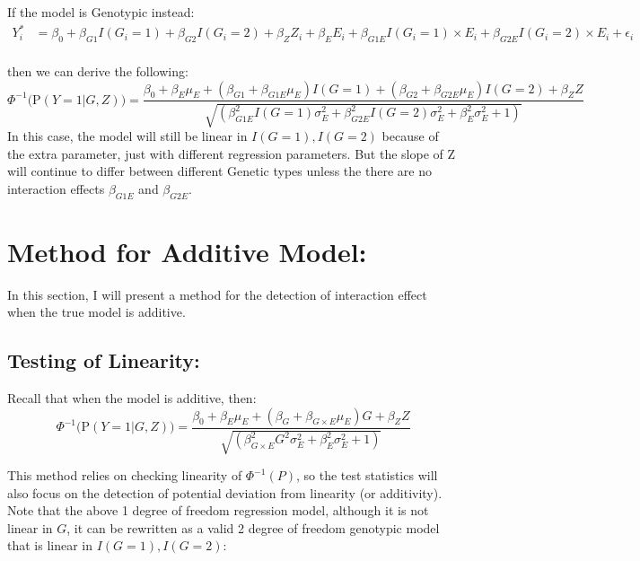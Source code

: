 \documentclass[
]{article}
\begin{document}
If the model is Genotypic instead: \begin{equation}\label{eqn:genointer}
\begin{aligned}
Y_i^* &= \beta_0 + \beta_{G1} I(G_i = 1) + \beta_{G2} I(G_i = 2) + \beta_Z Z_i + \beta_E E_i + \beta_{G1E} I(G_i = 1) \times E_i + \beta_{G2E} I(G_i = 2) \times E_i  + \epsilon_i \\
\end{aligned}
\end{equation}

then we can derive the following:
\[\Phi^{-1} \bigg(\text{P}(Y = 1 | G, Z) \bigg) = \frac{\beta_0+\beta_E \mu_E+(\beta_{G1} + \beta_{G1E} \mu_E)I(G = 1)+(\beta_{G2} + \beta_{G2E} \mu_E)I(G = 2) + \beta_Z Z}{\sqrt{(\beta_{G1E}^2 I(G = 1) \sigma_E^2 +\beta_{G2E}^2 I(G = 2) \sigma_E^2 + \beta_E^2 \sigma_E^2 + 1)}} \]
In this case, the model will still be linear in \(I(G = 1), I(G = 2)\)
because of the extra parameter, just with different regression
parameters. But the slope of Z will continue to differ between different
Genetic types unless the there are no interaction effects
\(\beta_{G1E}\) and \(\beta_{G2E}\).

\clearpage

\hypertarget{method-for-additive-model}{%
\section{Method for Additive Model:}\label{method-for-additive-model}}

In this section, I will present a method for the detection of
interaction effect when the true model is additive.

\hypertarget{testing-of-linearity}{%
\subsection{Testing of Linearity:}\label{testing-of-linearity}}

Recall that when the model is additive, then:
\[\Phi^{-1} \bigg(\text{P}(Y = 1 | G, Z) \bigg) = \frac{\beta_0+\beta_E \mu_E+(\beta_G + \beta_{G\times E} \mu_E)G + \beta_Z Z}{\sqrt{(\beta_{G\times E}^2 G^2 \sigma_E^2 + \beta_E^2 \sigma_E^2 + 1)}}\]

This method relies on checking linearity of \(\Phi^{-1}(P)\), so the
test statistics will also focus on the detection of potential deviation
from linearity (or additivity). Note that the above 1 degree of freedom
regression model, although it is not linear in \(G\), it can be
rewritten as a valid 2 degree of freedom genotypic model that is linear
in \(I(G=1), I(G=2)\):
\end{document}
